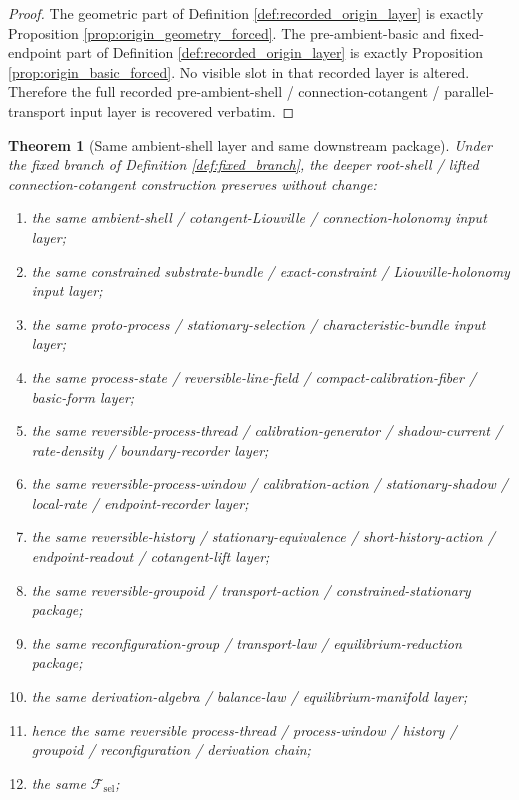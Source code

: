 \documentclass[11pt]{article}
\newcommand{\StemFunctional}{\mathscr F_{\mathrm{sel}}}
\newtheorem{theorem}{Theorem}
\begin{document}
\begin{proof}
The geometric part of Definition \ref{def:recorded_origin_layer} is exactly Proposition \ref{prop:origin_geometry_forced}. The pre-ambient-basic and fixed-endpoint part of Definition \ref{def:recorded_origin_layer} is exactly Proposition \ref{prop:origin_basic_forced}. No visible slot in that recorded layer is altered. Therefore the full recorded pre-ambient-shell / connection-cotangent / parallel-transport input layer is recovered verbatim.
\end{proof}

\begin{theorem}[Same ambient-shell layer and same downstream package]
\label{thm:same_package}
Under the fixed branch of Definition \ref{def:fixed_branch}, the deeper root-shell / lifted connection-cotangent construction preserves without change:
\begin{enumerate}
    \item the same ambient-shell / cotangent-Liouville / connection-holonomy input layer;
    \item the same constrained substrate-bundle / exact-constraint / Liouville-holonomy input layer;
    \item the same proto-process / stationary-selection / characteristic-bundle input layer;
    \item the same process-state / reversible-line-field / compact-calibration-fiber / basic-form layer;
    \item the same reversible-process-thread / calibration-generator / shadow-current / rate-density / boundary-recorder layer;
    \item the same reversible-process-window / calibration-action / stationary-shadow / local-rate / endpoint-recorder layer;
    \item the same reversible-history / stationary-equivalence / short-history-action / endpoint-readout / cotangent-lift layer;
    \item the same reversible-groupoid / transport-action / constrained-stationary package;
    \item the same reconfiguration-group / transport-law / equilibrium-reduction package;
    \item the same derivation-algebra / balance-law / equilibrium-manifold layer;
    \item hence the same reversible process-thread / process-window / history / groupoid / reconfiguration / derivation chain;
    \item the same \(\StemFunctional\);

\end{enumerate}
\end{theorem}
\end{document}
